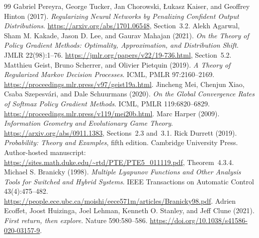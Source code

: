 \documentclass[11pt]{article}
\begin{document}
\begin{thebibliography}{99}
 Gabriel Pereyra, George Tucker, Jan Chorowski,
\L ukasz Kaiser, and Geoffrey Hinton (2017).
\emph{Regularizing Neural Networks by Penalizing Confident Output Distributions}.
\url{https://arxiv.org/abs/1701.06548}, Section~3.2.
 Alekh Agarwal, Sham M. Kakade, Jason D. Lee,
and Gaurav Mahajan (2021).
\emph{On the Theory of Policy Gradient Methods: Optimality, Approximation,
and Distribution Shift}. JMLR 22(98):1--76.
\url{https://jmlr.org/papers/v22/19-736.html}, Section~5.2.
 Matthieu Geist, Bruno Scherrer, and Olivier Pietquin (2019).
\emph{A Theory of Regularized Markov Decision Processes}.
ICML, PMLR 97:2160--2169.
\url{https://proceedings.mlr.press/v97/geist19a.html}.
 Jincheng Mei, Chenjun Xiao, Csaba Szepesv\'ari,
and Dale Schuurmans (2020).
\emph{On the Global Convergence Rates of Softmax Policy Gradient Methods}.
ICML, PMLR 119:6820--6829.
\url{https://proceedings.mlr.press/v119/mei20b.html}.
 Marc Harper (2009).
\emph{Information Geometry and Evolutionary Game Theory}.
\url{https://arxiv.org/abs/0911.1383}, Sections~2.3 and~3.1.
 Rick Durrett (2019).
\emph{Probability: Theory and Examples}, fifth edition.
Cambridge University Press. Author-hosted manuscript:
\url{https://sites.math.duke.edu/~rtd/PTE/PTE5_011119.pdf}, Theorem~4.3.4.
 Michael S. Branicky (1998).
\emph{Multiple Lyapunov Functions and Other Analysis Tools for Switched and Hybrid Systems}.
IEEE Transactions on Automatic Control 43(4):475--482.
\url{https://people.ece.ubc.ca/moishi/eece571m/articles/Branicky98.pdf}.
 Adrien Ecoffet, Joost Huizinga, Joel Lehman,
Kenneth O. Stanley, and Jeff Clune (2021).
\emph{First return, then explore}. Nature 590:580--586.
\url{https://doi.org/10.1038/s41586-020-03157-9}.


\end{thebibliography}
\end{document}
